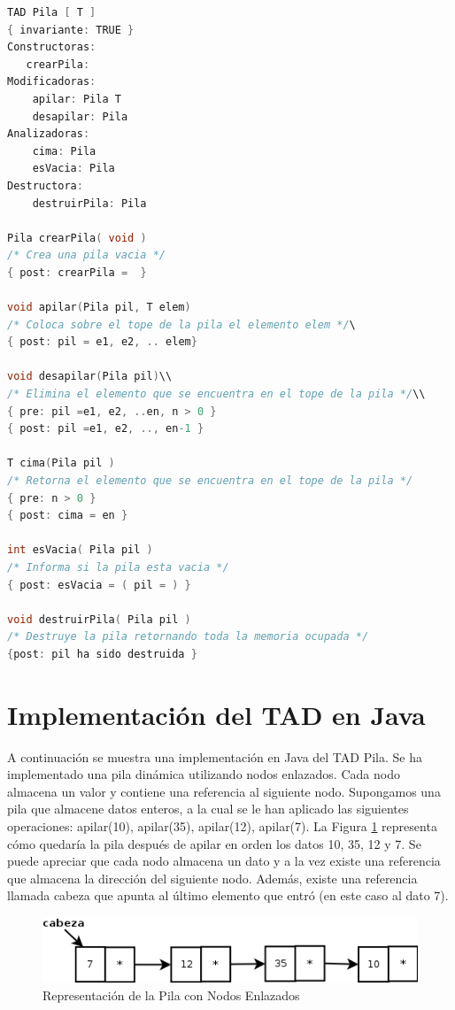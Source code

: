 \begin{lstlisting}[numbers=none, language=C]
TAD Pila [ T ]
{ invariante: TRUE }
Constructoras:
   crearPila: 
Modificadoras:
	apilar: Pila T 
	desapilar: Pila
Analizadoras:
	cima: Pila 
	esVacia: Pila
Destructora:
	destruirPila: Pila

Pila crearPila( void )
/* Crea una pila vacia */
{ post: crearPila =  }

void apilar(Pila pil, T elem)
/* Coloca sobre el tope de la pila el elemento elem */\
{ post: pil = e1, e2, .. elem}

void desapilar(Pila pil)\\
/* Elimina el elemento que se encuentra en el tope de la pila */\\
{ pre: pil =e1, e2, ..en, n > 0 }
{ post: pil =e1, e2, .., en-1 }

T cima(Pila pil )
/* Retorna el elemento que se encuentra en el tope de la pila */
{ pre: n > 0 }
{ post: cima = en }

int esVacia( Pila pil )
/* Informa si la pila esta vacia */
{ post: esVacia = ( pil = ) }

void destruirPila( Pila pil )
/* Destruye la pila retornando toda la memoria ocupada */
{post: pil ha sido destruida }
\end{lstlisting}

\section{Implementación del TAD en Java}
A continuación se muestra una implementación en Java del TAD Pila. Se ha implementado una pila dinámica utilizando nodos enlazados.  Cada nodo almacena un valor y contiene una referencia al siguiente nodo. Supongamos una pila que almacene datos enteros, a la cual se le han aplicado las siguientes operaciones: apilar(10), apilar(35), apilar(12), apilar(7). La Figura \ref{fig:pila-nodos-enlazados} representa cómo quedaría la pila después de apilar en orden los datos 10, 35, 12 y 7. Se puede apreciar que cada nodo almacena un dato y a la vez existe una referencia que almacena la dirección del siguiente nodo. Además, existe una referencia llamada cabeza que apunta al último elemento que entró (en este caso al dato 7).

\begin{figure}
	\centering
	\includegraphics[scale=0.7]{images/RepresentacionPilaNodosEnlazados}
	\caption{Representación de la Pila con Nodos Enlazados}	
	\label{fig:pila-nodos-enlazados}
\end{figure}

